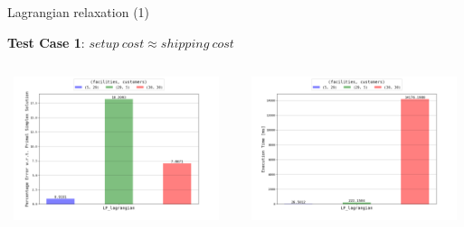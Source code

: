 \documentclass{beamer}
\begin{document}
	    \begin{frame}{Lagrangian relaxation (1)}
	  
	  \textbf{Test Case 1}: $setup \ cost \approx shipping \ cost$
  
	   \begin{columns}
	   \centering
        \includegraphics[width=6.5cm,height=4.2cm]{img/chart_error_lagrangian_0.png}
        
        \centering
        \includegraphics[width=6.5cm,height=4.2cm]{img/chart_time_lagrangian_0.png}
        \end{columns}
	   
	    \end{frame}
	       
\end{document}
